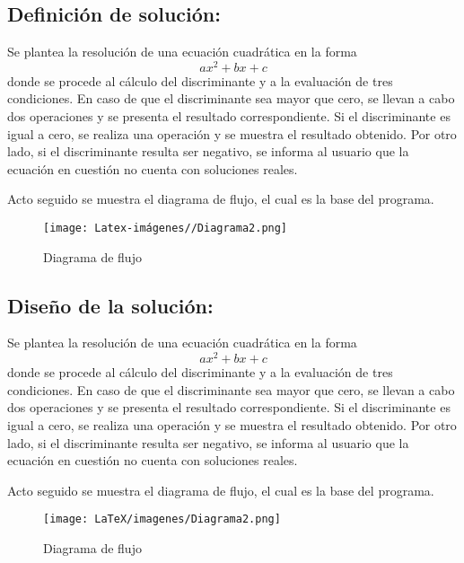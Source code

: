 \subsection{\textbf{Definición de solución:}}
Se plantea la resolución de una ecuación cuadrática en la forma 
\begin{equation}
ax^{2}+bx+c
\end{equation}
donde se procede al cálculo del discriminante y a la evaluación de tres condiciones. En caso de que el discriminante sea mayor que cero, se llevan a cabo dos operaciones y se presenta el resultado correspondiente. Si el discriminante es igual a cero, se realiza una operación y se muestra el resultado obtenido. Por otro lado, si el discriminante resulta ser negativo, se informa al usuario que la ecuación en cuestión no cuenta con soluciones reales.

Acto seguido se muestra el diagrama de flujo, el cual es la base del programa.

\begin{figure}[H]
    \centering
    \texttt{[image: Latex-imágenes//Diagrama2.png]}
    \caption{Diagrama de flujo}
    \label{fig:diagrama de flujo}
\end{figure}


\subsection{\textbf{Diseño de la solución:}}
Se plantea la resolución de una ecuación cuadrática en la forma 
\begin{equation}
ax^{2}+bx+c
\end{equation}
donde se procede al cálculo del discriminante y a la evaluación de tres condiciones. En caso de que el discriminante sea mayor que cero, se llevan a cabo dos operaciones y se presenta el resultado correspondiente. Si el discriminante es igual a cero, se realiza una operación y se muestra el resultado obtenido. Por otro lado, si el discriminante resulta ser negativo, se informa al usuario que la ecuación en cuestión no cuenta con soluciones reales.

Acto seguido se muestra el diagrama de flujo, el cual es la base del programa.

\begin{figure}[H]
    \centering
    \texttt{[image: LaTeX/imagenes/Diagrama2.png]}
    \caption{Diagrama de flujo}
    \label{fig:diagrama de flujo}
\end{figure}


